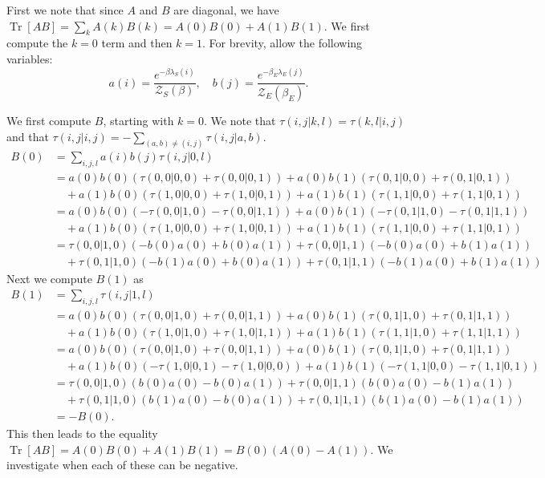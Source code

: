 \documentclass{article}
\newcommand{\brackets}[1]{\left[ #1 \right]}
\DeclareMathOperator{\Tr}{Tr}
\newcommand{\trace}[1]{\Tr \brackets{ #1 }}
\newcommand{\partfun}{\mathcal{Z}}
\begin{document}
First we note that since $A$ and $B$ are diagonal, we have $\trace{AB} = \sum_{k} A(k) B(k) = A(0)B(0) + A(1) B(1)$. We first compute the $k=0$ term and then $k=1$. For brevity, allow the following variables:
\begin{equation}
    a(i) = \frac{e^{-\beta \lambda_S(i)}}{\partfun_S(\beta)}, \quad b(j) = \frac{e^{-\beta_E \lambda_E(j)}}{\partfun_E(\beta_E)}.
\end{equation}

We first compute $B$, starting with $k=0$. We note that $\tau(i,j| k,l) = \tau(k,l |i,j)$ and that $\tau(i,j|i,j) = -\sum_{(a,b) \neq (i,j)} \tau(i,j| a,b)$.
\begin{align}
    B(0) &= \sum_{i,j,l} a(i) b(j) \tau(i,j|0,l) \\
    &= a(0) b(0) (\tau(0,0|0,0) + \tau(0,0|0,1)) + a(0)b(1) (\tau(0,1| 0,0) + \tau(0,1| 0,1)) \nonumber \\
    &\quad + a(1) b(0) (\tau(1,0|0,0) + \tau(1,0|0,1)) + a(1) b(1) (\tau(1,1|0,0) + \tau(1,1|0,1)) \\
    &= a(0) b(0) (-\tau(0,0|1,0) - \tau(0,0|1,1)) + a(0)b(1) (- \tau(0,1|1,0) -\tau(0,1|1,1)) \nonumber \\
    &\quad + a(1) b(0) (\tau(1,0|0,0) + \tau(1,0|0,1)) + a(1) b(1) (\tau(1,1|0,0) + \tau(1,1|0,1)) \\
    &= \tau(0,0|1,0) (-b(0) a(0) + b(0) a(1)) + \tau(0,0|1,1)(-b(0) a(0) + b(1) a(1)) \nonumber \\
    &\quad + \tau(0,1|1,0) (-b(1) a(0) + b(0) a(1)) + \tau(0,1|1,1)(-b(1) a(0) + b(1) a(1))
\end{align}
Next we compute $B(1)$ as
\begin{align}
    B(1) &= \sum_{i,j,l} \tau(i,j|1,l) \\
    &= a(0) b(0) (\tau(0,0|1,0) + \tau(0,0|1,1)) + a(0)b(1) (\tau(0,1| 1,0) + \tau(0,1| 1,1)) \nonumber \\
    &\quad + a(1) b(0) (\tau(1,0|1,0) + \tau(1,0|1,1)) + a(1) b(1) (\tau(1,1|1,0) + \tau(1,1|1,1)) \\
    &= a(0) b(0) (\tau(0,0|1,0) + \tau(0,0|1,1)) + a(0)b(1) (\tau(0,1| 1,0) + \tau(0,1| 1,1)) \nonumber \\
    &\quad + a(1) b(0) (- \tau(1,0|0,1) - \tau(1,0|0,0)) + a(1) b(1) (-\tau(1,1|0,0) - \tau(1,1|0,1)) \\
    &= \tau(0,0|1,0) (b(0) a(0) - b(0) a(1)) + \tau(0,0|1,1)(b(0) a(0) - b(1) a(1)) \nonumber \\
    &\quad + \tau(0,1|1,0) (b(1) a(0) - b(0) a(1)) + \tau(0,1|1,1)(b(1) a(0) - b(1) a(1)) \\
    &= - B(0).
\end{align}
This then leads to the equality $\trace{AB} = A(0) B(0) + A(1)B(1) = B(0) (A(0) - A(1))$. We investigate when each of these can be negative. 
\end{document}
